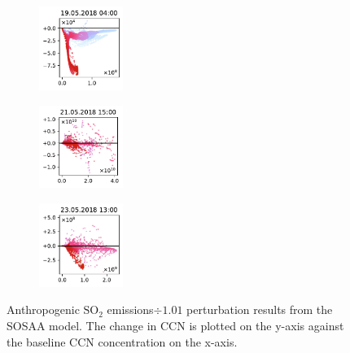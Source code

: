 \begin{figure}[H]
    \begin{subfigure}
        \centering
        \includegraphics[width=0.30\textwidth,valign=t]{evaluation/figures/perturbations/perturbation-19.05.2018:04.00-so2-div-1.01.pdf}
    \end{subfigure}
    \begin{subfigure}
        \centering
        \includegraphics[width=0.30\textwidth,valign=t]{evaluation/figures/perturbations/perturbation-21.05.2018:15.00-so2-div-1.01.pdf}
    \end{subfigure}
    \begin{subfigure}
        \centering
        \includegraphics[width=0.30\textwidth,valign=t]{evaluation/figures/perturbations/perturbation-23.05.2018:13.00-so2-div-1.01.pdf}
    \end{subfigure}

    \caption[$\text{SO}_2$ emissions$\div 1.01$ perturbation SOSAA results]{Anthropogenic $\text{SO}_2$ emissions$\div 1.01$ perturbation results from the SOSAA model. The change in CCN is plotted on the y-axis against the baseline CCN concentration on the x-axis.}
    \label{fig:sosaa-perturbation-so2-div-1.01}
\end{figure}


